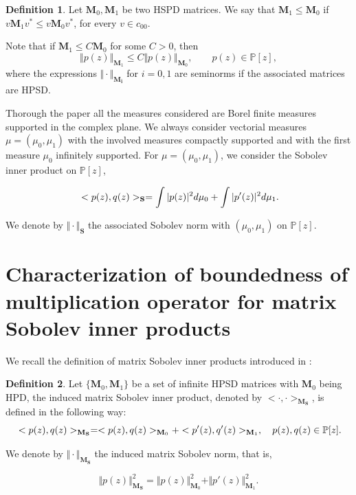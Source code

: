 \documentclass[12pt]{amsart}
\theoremstyle{definition}
\newtheorem{definition}{Definition}
\theoremstyle{plain}
\theoremstyle{remark}
\begin{document}
\begin{definition} Let $\mathbf{M}_0,\mathbf{M}_1$  be two HSPD  matrices. We say that
 $\mathbf{M}_1 \leq \mathbf{M}_0$ if
$
v\mathbf{M}_1v^{*} \leq v \mathbf{M}_0v^{*}$,    for every $v\in c_{00}$.

\end{definition}



\noindent Note that if $\mathbf{M}_1 \leq C\mathbf{M}_0$ for some $C>0$, then 
$$
\Vert p(z) \Vert_{\mathbf{M}_1} \leq C \Vert p(z)\Vert_{\mathbf{M}_0}, \qquad p(z) \in \mathbb{P}[z],
$$
\noindent where the expressions $\Vert \cdot \Vert_{\mathbf{M_i}}$ for $i=0,1$ are seminorms if the associated matrices are HPSD. 

\bigskip
\noindent Thorough  the paper all the measures considered are Borel finite measures supported in the complex plane. We always consider vectorial measures $\mu=(\mu_0,\mu_1)$ with the involved measures compactly supported and with the first measure $\mu_0$  infinitely supported. For $\mu=(\mu_0,\mu_1)$, we consider the Sobolev inner product on $\mathbb{P}[z]$,

\begin{equation}{\label{dosmedidas}}
<p(z),q(z)>_{\mathbf{S}}= \int \vert p(z) \vert^{2} d\mu_0 + \int \vert p'(z) \vert^{2} d\mu_1.
\end{equation}
 



\noindent We denote by $\Vert \cdot \Vert_{\mathbf{S}}$ the associated Sobolev norm with $(\mu_0,\mu_1)$ on $\mathbb{P}[z]$. 

\section{Characterization of boundedness of multiplication operator for matrix Sobolev inner products}
\noindent We recall the definition of matrix Sobolev inner products introduced in \cite{EG23}:  

\begin{definition} Let $\{\mathbf{M}_0,\mathbf{M}_1\}$ be a set of infinite HPSD matrices  with $\mathbf{M}_0$ being HPD,  the induced matrix Sobolev inner  product, denoted by $<\cdot,\cdot>_{\mathbf{M_S}}$,  is defined in the following way:
\begin{equation}{\label{dosmatrices}}
<p(z),q(z)>_{\mathbf{M}_{\mathbf{S}}}= <p(z),q(z)>_{\mathbf{M}_0}+ <p'(z),q'(z)>_{\mathbf{M}_1}, \quad p(z),q(z)\in \mathbb{P}[z].
\end{equation}


\noindent We denote  by $\Vert \cdot \Vert_{\mathbf{M_S}}$ the induced matrix Sobolev norm, that is, 

$$
\Vert p(z) \Vert^{2}_{\mathbf{M}_{\mathbf{S}}}= 
\Vert p(z) \Vert^{2}_{\mathbf{M}_0} + \Vert  p'(z)\Vert^{2}_{\mathbf{M}_1}.
$$
\end{definition} 
\end{document}
